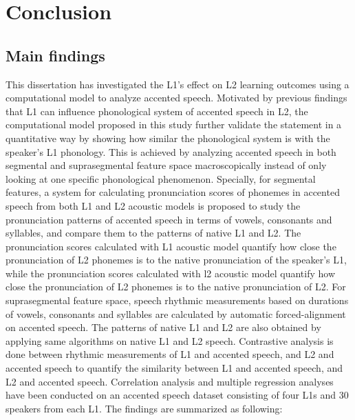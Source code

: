 \chapter{Conclusion}
\label{conclusion}

\section{Main findings}

This dissertation has investigated the L1's effect on L2 learning outcomes using a computational model to analyze accented speech. Motivated by previous findings that L1 can influence phonological system of accented speech in L2, the computational model proposed in this study further validate the statement in a quantitative way by showing how similar the phonological system is with the speaker's L1 phonology. This is achieved by analyzing accented speech in both segmental and suprasegmental feature space macroscopically instead of only looking at one specific phonological phenomenon. Specially, for segmental features, a system for calculating pronunciation scores of phonemes in accented speech from both L1 and L2 acoustic models is proposed to study the pronunciation patterns of accented speech in terms of vowels, consonants and syllables, and compare them to the patterns of native L1 and L2. The pronunciation scores calculated with L1 acoustic model quantify how close the pronunciation of L2 phonemes is to the native pronunciation of the speaker's L1, while the pronunciation scores calculated with l2 acoustic model quantify how close the pronunciation of L2 phonemes is to the native pronunciation of L2. For suprasegmental feature space, speech rhythmic measurements based on durations of vowels, consonants and syllables are calculated by automatic forced-alignment on accented speech. The patterns of native L1 and L2 are also obtained by applying same algorithms on native L1 and L2 speech. Contrastive analysis is done between rhythmic measurements of L1 and accented speech, and L2 and accented speech to quantify the similarity between L1 and accented speech, and L2 and accented speech. Correlation analysis and multiple regression analyses have been conducted on an accented speech dataset consisting of four L1s and 30 speakers from each L1. The findings are summarized as following:

